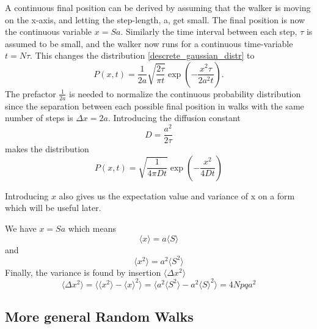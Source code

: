 A continuous final position can be derived by assuming that the walker is moving on the x-axis, and letting the step-length, a, get small. 
The final position is now the continuous variable $x=Sa$.
Similarly the time interval between each step, $\tau$ is assumed to be small, and the walker now runs for a continuous time-variable $t=N\tau$.
This changes the distribution \ref{descrete_gaussian_distr} to
\begin{equation}
 P(x,t) = \frac{1}{2a}\sqrt{\frac{2\tau}{\pi t}}\exp\left(-\frac{x^2\tau}{2a^2t}\right). 
\end{equation}
The prefactor $\frac{1}{2a}$ is needed to normalize the continuous probability distribution since the separation between each possible final position in walks with the same number of steps is $\Delta x=2a$. 
Introducing the diffusion constant
\begin{equation}
D = \frac{a^2}{2\tau} 
\end{equation}
makes the distribution
\begin{equation}
 P(x,t) = \sqrt{\frac{1}{4\pi Dt}}\exp\left(-\frac{x^2}{4Dt}\right)
\end{equation}

Introducing $x$ also gives us the expectation value and variance of x on a form which will be useful later. 

We have $x=Sa$ which means 
$$\langle x\rangle=a\langle S\rangle$$ 
and 
$$\langle x^2\rangle=a^2\langle S^2\rangle$$
Finally, the variance is found by insertion $\langle \Delta x^2\rangle$
\begin{equation}\label{random_walk_variance}
 \langle \Delta x^2\rangle = \langle\langle x^2\rangle -\langle x\rangle^2\rangle = \langle a^2\langle S^2\rangle -a^2\langle S\rangle^2\rangle = 4Npqa^2
\end{equation}


\subsection{More general Random Walks}\label{more_general_random_walks}

